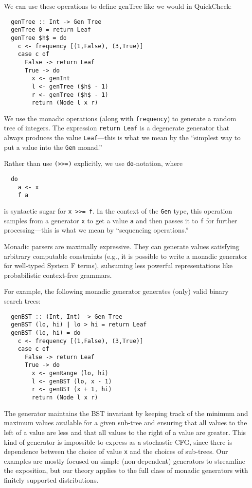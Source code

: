 We can use these operations to define {\sf genTree} like we would in QuickCheck:
\begin{lstlisting}
  genTree :: Int -> Gen Tree
  genTree 0 = return Leaf
  genTree $h$ = do
    c <- frequency [(1,False), (3,True)]
    case c of
      False -> return Leaf
      True -> do
        x <- genInt
        l <- genTree ($h$ - 1)
        r <- genTree ($h$ - 1)
        return (Node l x r)
\end{lstlisting}
We use the monadic operations (along with \lstinline{frequency}) to generate a
random tree of integers. The expression \lstinline{return Leaf} is a degenerate
generator that always produces the value \lstinline{Leaf}---this is what we mean
by the ``simplest way to put a value into the \lstinline{Gen} monad.''

Rather than use \lstinline{(>>=)} explicitly, we use \lstinline{do}-notation,
where
\begin{lstlisting}
  do
    a <- x
    f a
\end{lstlisting}
\noindent is syntactic sugar for \lstinline{x >>= f}. In the context of the
\lstinline{Gen} type, this operation samples from a generator \lstinline{x} to
get a value \lstinline{a} and then passes it to \lstinline{f} for further
processing---this is what we mean by ``sequencing operations.''

\smallskip

Monadic parsers are maximally expressive.  They can generate values satisfying
arbitrary computable constraints (e.g., it is possible to write a monadic
generator for well-typed System F terms), subsuming less powerful
representations like probabilistic context-free grammars.

For example, the following monadic generator generates (only) valid binary
search trees:
\begin{lstlisting}
  genBST :: (Int, Int) -> Gen Tree
  genBST (lo, hi) | lo > hi = return Leaf
  genBST (lo, hi) = do
    c <- frequency [(1,False), (3,True)]
    case c of
      False -> return Leaf
      True -> do
        x <- genRange (lo, hi)
        l <- genBST (lo, x - 1)
        r <- genBST (x + 1, hi)
        return (Node l x r)
\end{lstlisting}
\noindent The generator maintains the BST invariant by keeping track of the
minimum and maximum values available for a given sub-tree and ensuring that all
values to the left of a value are less and that all values to the right of a
value are greater.  This kind of generator is impossible to express as a
stochastic CFG, since there is dependence between the choice of value
\lstinline{x} and the choices of sub-trees. Our examples are mostly focused on
simple (non-dependent) generators to streamline the exposition, but our theory
applies to the full class of monadic generators with finitely supported
distributions.

